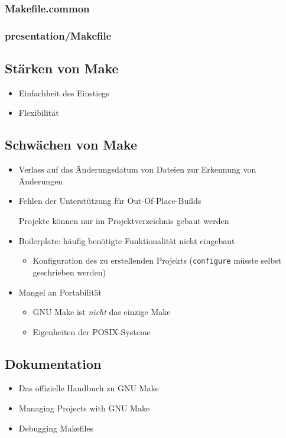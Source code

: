 \begin{frame}[allowframebreaks]
	\frametitle{Makefile.common}
\end{frame}

\begin{frame}
	\frametitle{presentation/Makefile}
\end{frame}

\subsection{Stärken von Make}
\begin{frame}
	\begin{itemize}
		\item Einfachheit des Einstiegs
		\item Flexibilität
	\end{itemize}
\end{frame}

\subsection{Schwächen von Make}
\begin{frame}
	\begin{itemize}
		\item Verlass auf das Änderungsdatum von Dateien zur Erkennung von Änderungen
		\item Fehlen der Unterstützung für Out-Of-Place-Builds

			Projekte können nur im Projektverzeichnis gebaut werden
		\item Boilerplate: häufig benötigte Funktionalität nicht eingebaut
			\begin{itemize}
				\item Konfiguration des zu erstellenden Projekts (\texttt{configure} müsste selbst geschrieben werden)
			\end{itemize}
		\item Mangel an Portabilität
			\begin{itemize}
				\item GNU Make ist \emph{nicht} das einzige Make
				\item Eigenheiten der POSIX-Systeme
			\end{itemize}
	\end{itemize}
\end{frame}

\subsection{Dokumentation}
\begin{frame}
	\begin{itemize}
	\item Das offizielle Handbuch zu GNU Make \cite{GNU_Make_manual}
	\item Managing Projects with GNU Make \cite{OreillyMake}
	\item Debugging Makefiles \cite{DobbsDebuggingMakefiles}
	\end{itemize}
\end{frame}
